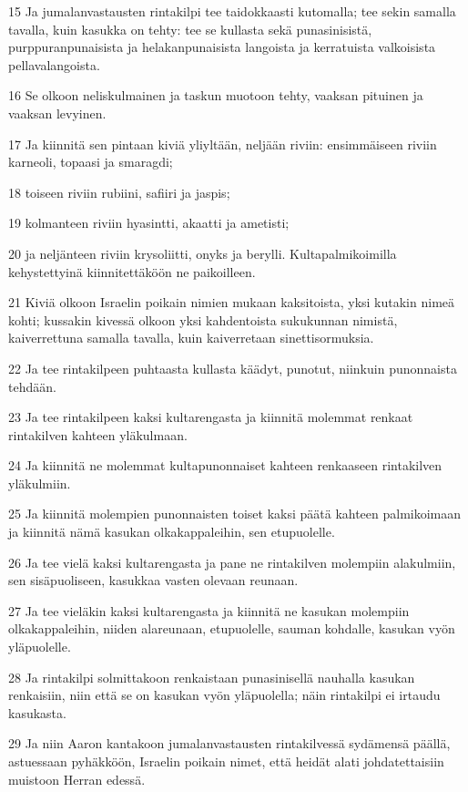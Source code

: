 \par 15 Ja jumalanvastausten rintakilpi tee taidokkaasti kutomalla; tee sekin samalla tavalla, kuin kasukka on tehty: tee se kullasta sekä punasinisistä, purppuranpunaisista ja helakanpunaisista langoista ja kerratuista valkoisista pellavalangoista.
\par 16 Se olkoon neliskulmainen ja taskun muotoon tehty, vaaksan pituinen ja vaaksan levyinen.
\par 17 Ja kiinnitä sen pintaan kiviä yliyltään, neljään riviin: ensimmäiseen riviin karneoli, topaasi ja smaragdi;
\par 18 toiseen riviin rubiini, safiiri ja jaspis;
\par 19 kolmanteen riviin hyasintti, akaatti ja ametisti;
\par 20 ja neljänteen riviin krysoliitti, onyks ja berylli. Kultapalmikoimilla kehystettyinä kiinnitettäköön ne paikoilleen.
\par 21 Kiviä olkoon Israelin poikain nimien mukaan kaksitoista, yksi kutakin nimeä kohti; kussakin kivessä olkoon yksi kahdentoista sukukunnan nimistä, kaiverrettuna samalla tavalla, kuin kaiverretaan sinettisormuksia.
\par 22 Ja tee rintakilpeen puhtaasta kullasta käädyt, punotut, niinkuin punonnaista tehdään.
\par 23 Ja tee rintakilpeen kaksi kultarengasta ja kiinnitä molemmat renkaat rintakilven kahteen yläkulmaan.
\par 24 Ja kiinnitä ne molemmat kultapunonnaiset kahteen renkaaseen rintakilven yläkulmiin.
\par 25 Ja kiinnitä molempien punonnaisten toiset kaksi päätä kahteen palmikoimaan ja kiinnitä nämä kasukan olkakappaleihin, sen etupuolelle.
\par 26 Ja tee vielä kaksi kultarengasta ja pane ne rintakilven molempiin alakulmiin, sen sisäpuoliseen, kasukkaa vasten olevaan reunaan.
\par 27 Ja tee vieläkin kaksi kultarengasta ja kiinnitä ne kasukan molempiin olkakappaleihin, niiden alareunaan, etupuolelle, sauman kohdalle, kasukan vyön yläpuolelle.
\par 28 Ja rintakilpi solmittakoon renkaistaan punasinisellä nauhalla kasukan renkaisiin, niin että se on kasukan vyön yläpuolella; näin rintakilpi ei irtaudu kasukasta.
\par 29 Ja niin Aaron kantakoon jumalanvastausten rintakilvessä sydämensä päällä, astuessaan pyhäkköön, Israelin poikain nimet, että heidät alati johdatettaisiin muistoon Herran edessä.
